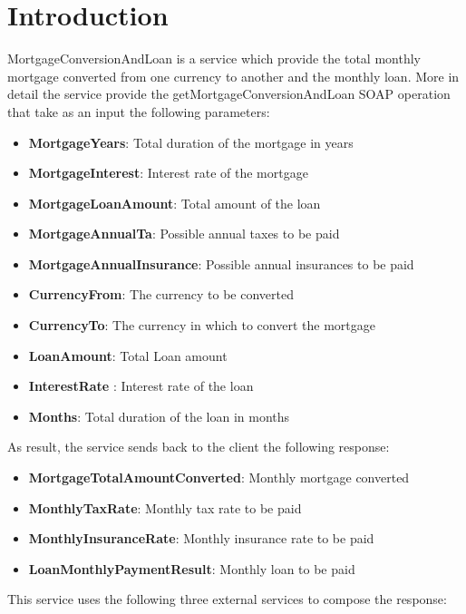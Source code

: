 \documentclass[
10pt, %
a4paper, %
oneside, %
headinclude,footinclude, %
BCOR5mm, %
]{scrartcl}
\begin{document}
\section{Introduction}
MortgageConversionAndLoan is a service which provide the total monthly
mortgage converted from one currency to another and the monthly loan.
More in detail the service provide the getMortgageConversionAndLoan SOAP operation
that take as an input the following parameters:
\begin{itemize}

\item \textbf{MortgageYears}: Total duration of the mortgage in years
\item \textbf{MortgageInterest}: Interest rate of the mortgage
\item \textbf{MortgageLoanAmount}: Total amount of the loan
\item \textbf{MortgageAnnualTa}: Possible annual taxes to be paid
\item \textbf{MortgageAnnualInsurance}: Possible annual insurances to be paid
\item \textbf{CurrencyFrom}: The currency to be converted
\item \textbf{CurrencyTo}: The currency in which to convert the mortgage
\item \textbf{LoanAmount}: Total Loan amount
\item \textbf{InterestRate} : Interest rate of the loan
\item \textbf{Months}: Total duration of the loan in months

\end{itemize}
As result, the service sends back to the client the following response:

\begin{itemize}
\item \textbf{MortgageTotalAmountConverted}: Monthly mortgage converted
\item \textbf{MonthlyTaxRate}: Monthly tax rate to be paid
\item \textbf{MonthlyInsuranceRate}: Monthly insurance rate to be paid
\item \textbf{LoanMonthlyPaymentResult}: Monthly loan to be paid
\end{itemize}

This service uses the following three external services to compose the
response:
\end{document}
